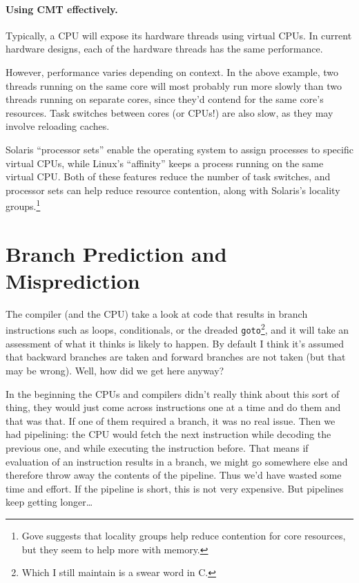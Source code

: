 \documentclass[a4paper]{report}
\begin{document}
\paragraph{Using CMT effectively.} Typically, a CPU will expose its
hardware threads using virtual CPUs.
In current hardware designs, each of the hardware threads has the same
performance. 

However, performance varies depending on context. In the above
example, two threads running on the same core will most probably run
more slowly than two threads running on separate cores, since they'd
contend for the same core's resources. Task switches between cores (or
CPUs!) are also slow, as they may involve reloading caches.

Solaris ``processor sets''
enable the operating system to assign processes to specific virtual CPUs,
while Linux's ``affinity'' keeps a process running on the same virtual CPU.
Both of these features reduce the number of task switches, and processor
sets can help reduce resource contention, along with Solaris's locality
groups.\footnote{Gove suggests that locality groups help reduce contention
for core resources, but they seem to help more with memory.}



\section*{Branch Prediction and Misprediction}

The compiler (and the CPU) take a look at code that results in branch instructions  such as loops, conditionals, or the dreaded \texttt{goto}\footnote{Which I still maintain is a swear word in C.}, and it will take an assessment of what it thinks is likely to happen. By default I think it's assumed that backward branches are taken and forward branches are not taken (but that may be wrong).  Well, how did we get here anyway?

In the beginning the CPUs and compilers didn't really think about this sort of thing, they would just come across instructions one at a time and do them and that was that. If one of them required a branch, it was no real issue. Then we had pipelining: the CPU would fetch the next instruction while decoding the previous one, and while executing the instruction before. That means if evaluation of an instruction results in a branch, we might go somewhere else and therefore throw away the contents of the pipeline. Thus we'd have wasted some time and effort. If the pipeline is short, this is not very expensive. But pipelines keep getting longer\ldots
\end{document}
